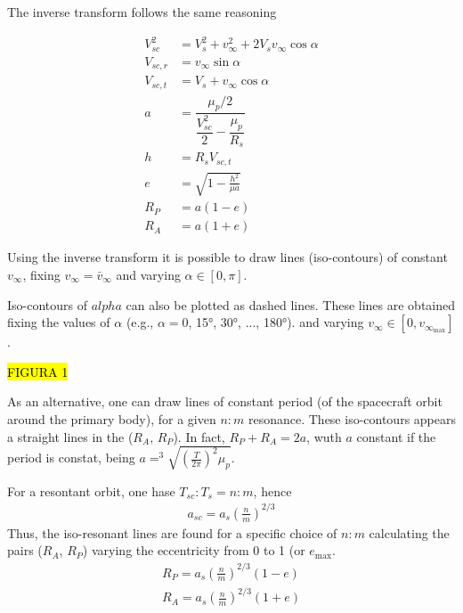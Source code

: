 \documentclass{article}
\newcommand{\vinf}{v_\infty}
\begin{document}
The inverse transform follows the same reasoning

\begin{align}
    V_{sc}^2 & = V_s^2 + \vinf^2 + 2 V_s \vinf \cos\alpha                \\
    V_{sc,r} & = \vinf \sin\alpha                                        \\
    V_{sc,t} & = V_s + \vinf \cos\alpha                                  \\
    a        & = \dfrac{\mu_p/2}{\dfrac{V_{sc}^2}{2}-\dfrac{\mu_p}{R_s}} \\
    h        & = R_s V_{sc,t}                                            \\
    e        & = \sqrt{1-\frac{h^2}{\mu a}}                              \\
    R_P      & = a(1-e)                                                  \\
    R_A      & = a(1+e)
\end{align}



Using the inverse transform it is possible to draw lines (iso-contours) of constant $\vinf$,
fixing $\vinf=\bar{v}_\infty$ and
varying $\alpha \in [0, \pi]$.

Iso-contours of $alpha$ can also be plotted as dashed lines. These lines are obtained fixing the values of $\alpha$ (e.g., $\alpha=0$, 15°, 30°, ..., 180°). and varying $\vinf \in [0, v_{\infty_\text{max}}]$.


\hl{FIGURA 1}


As an alternative, one can draw lines of constant period (of the spacecraft orbit around the primary body), for a given $n:m$ resonance.
These iso-contours appears a straight lines in the ($R_A$, $R_P$).
In fact, $R_P+R_A = 2 a$, wuth $a$ constant if the period is constat, being $a = ^3\sqrt{\left(\frac{T}{2\pi}\right)^2\mu_p}$.

For a resontant orbit, one hase $T_{sc}:T_s = n:m$, hence
\begin{align}
    a_{sc} = a_s (\frac{n}{m})^{2/3}
\end{align}
Thus, the iso-resonant lines are found for a specific choice of $n:m$ calculating the pairs ($R_A$, $R_P$) varying the eccentricity from 0 to 1 (or $e_\text{max}$.
\begin{align}
    R_P = a_s (\frac{n}{m})^{2/3} \left(1-e\right) \\
    R_A = a_s (\frac{n}{m})^{2/3} \left(1+e\right)
\end{align}
\end{document}
